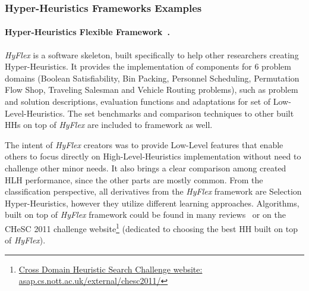 \subsubsection{Hyper-Heuristics Frameworks Examples}\label{bg: hh fw examples}
\paragraph{Hyper-Heuristics Flexible Framework~\cite{ochoa2012hyflex}.} \textit{HyFlex} is a software skeleton, built specifically to help other researchers creating Hyper-Heuristics. It provides the implementation of components for 6 problem domains (Boolean Satisfiability, Bin Packing, Personnel Scheduling, Permutation Flow Shop, Traveling Salesman and Vehicle Routing problems), such as problem and solution descriptions, evaluation functions and adaptations for set of Low-Level-Heuristics. The set benchmarks and comparison techniques to other built HHs on top of \textit{HyFlex} are included to framework as well. 

The intent of \textit{HyFlex} creators was to provide Low-Level features that enable others to focus directly on High-Level-Heuristics implementation without need to challenge other minor needs. It also brings a clear comparison among created HLH performance, since the other parts are mostly common. From the classification perspective, all derivatives from the \textit{HyFlex} framework are Selection Hyper-Heuristics, however they utilize different learning approaches. Algorithms, built on top of \textit{HyFlex} framework could be found in many reviews~\cite{misir2012intelligent,ryser2014review,drake2019recent} or on the CHeSC 2011 challenge website\footnote{\href{http://www.asap.cs.nott.ac.uk/external/chesc2011/}{Cross Domain Heuristic Search Challenge website: asap.cs.nott.ac.uk/external/chesc2011/}} (dedicated to choosing the best HH built on top of \textit{HyFlex}).

